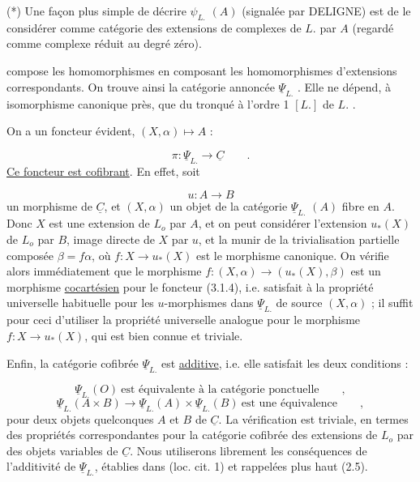 (*)  Une façon plus simple de décrire  $\psi_{L.}$ $(A)$  (signalée par DELIGNE) est de le considérer comme catégorie des extensions de complexes de  $L.$  par  $A$ (regardé comme complexe réduit au degré zéro).



 compose les homomorphismes en composant les homomorphismes d'extensions correspondants. On trouve ainsi la catégorie annoncée $\underline{\Psi}_{L.}$ . Elle ne dépend, à isomorphisme canonique près, que du tronqué à l'ordre 1 $[L.]$ de $L.$ .

On a un foncteur évident, $(X,\alpha) \longmapsto A$ :

\begin{equation}\tag{3.1.4}
\pi : \underline{\Psi}_{L.} \longrightarrow \underline{C} \qquad .
\end{equation}
\underline{Ce foncteur est cofibrant}. En effet, soit

\begin{equation*}
u: A \longrightarrow B
\end{equation*}
un morphisme de $\underline{C}$, et $(X,\alpha)$ un objet de la catégorie $\underline{\Psi}_{L.}$ $(A)$ fibre en $A$. Donc $X$ est une extension de $L_o$ par $A$, et on peut considérer l'extension $u_*(X)$ de $L_o$ par $B$, image directe de $X$ par $u$, et la munir de la trivialisation partielle composée $\beta = f\alpha$, où $f : X \longrightarrow u_*(X)$ est le morphisme canonique. On vérifie alors immédiatement que le morphisme $f : (X,\alpha) \longrightarrow (u_*(X),\beta)$ est un morphisme \underline{cocartésien} pour le foncteur (3.1.4), i.e. satisfait à la propriété universelle habituelle pour les $u$-morphismes dans $\underline{\Psi}_{L.}$ de source $(X,\alpha)$ ; il suffit pour ceci d'utiliser la propriété universelle analogue pour le morphisme $f : X \longrightarrow u_*(X)$, qui est bien connue et triviale.

Enfin, la catégorie cofibrée $\underline{\Psi}_{L.}$ est \underline{additive}, i.e. elle satisfait les deux conditions :

\begin{equation}\tag{3.1.5}
\underline{\Psi}_{L.} (O) \ \text{est équivalente à la catégorie ponctuelle} \qquad ,
\end{equation}
\begin{equation}\tag{3.1.6}
\underline{\Psi}_{L.} (A \times B) \longrightarrow \underline{\Psi}_{L.}(A) \times \underline{\Psi}_{L.} (B) \ \text{est une équivalence} \qquad ,
\end{equation}
pour deux objets quelconques $A$ et $B$ de $\underline{C}$. La vérification est triviale, en termes des propriétés correspondantes pour la catégorie cofibrée des extensions de $L_o$ par des objets variables de $\underline{C}$. Nous utiliserons librement
les conséquences de l'additivité de $\underline{\Psi}_{L.}$, établies dans (loc. cit. 1) et rappelées plus haut (2.5).

